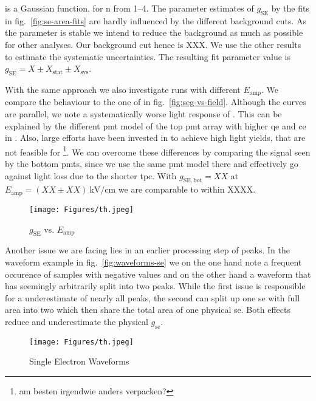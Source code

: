 is a Gaussian function, for n from \numrange{1}{4}.
The parameter estimates of $ g_\mathrm{SE} $ by the fits in fig.~\ref{fig:se-area-fits} are hardly influenced by the different background cuts.
As the parameter is stable we intend to reduce the background as much as possible for other analyses.
Our background cut hence is XXX.  %
We use the other results to estimate the systematic uncertainties.
The resulting fit parameter value is $ g_\mathrm{SE} = X \pm X_\mathrm{stat} \pm X_\mathrm{sys} $.  %


With the same approach we also investigate runs with different $ E_\mathrm{amp} $.
We compare the behaviour to the one of \oneton in fig.~\ref{fig:seg-vs-field}.
Although the curves are parallel, we note a systematically worse light response of \xebra.
This can be explained by the different \gls{pmt} model of the top \gls{pmt} array with higher \gls{qe} and \gls{ce} in \oneton.
Also, large efforts have been invested in \oneton to achieve high light yields, that are not feasible for \xebra\footnote{am besten irgendwie anders verpacken?}.
We can overcome these differences by comparing the signal seen by the bottom \gls{pmt}s, since we use the same \gls{pmt} model there and effectively go against light loss due to the shorter \gls{tpc}.
With $ g_\mathrm{SE, bot} = XX $ at $ E_\mathrm{amp} = \left( XX \pm XX \right) \SI{}{\kilo\volt\per\centi\meter} $ we are comparable to \oneton within XXXX.  %


\begin{figure}
    \centering
    \texttt{[image: Figures/th.jpeg]}  %
    \caption[\oneton comparison of Amplification Gain vs. Fieldstrength]{
        $ g_\mathrm{SE} $ vs. $ E_\mathrm{amp} $
    }
\end{figure}
    \label{fig:seg-vs-field}


Another issue we are facing lies in an earlier processing step of peaks.
In the waveform example in fig.~\ref{fig:waveforms-se} we on the one hand note a frequent occurence of samples with negative values and on the other hand a waveform that has seemingly arbitrarily split into two peaks.
While the first issue is responsible for a underestimate of nearly all peaks, the second can split up one \gls{se} with full area into two which then share the total area of one physical \gls{se}.
Both effects reduce and underestimate the physical $ g_\mathrm{se} $.


\begin{figure}
    \centering
    \texttt{[image: Figures/th.jpeg]}  %
    \caption[Single Electrons Waveforms]{
        Single Electron Waveforms
    }
\end{figure}


